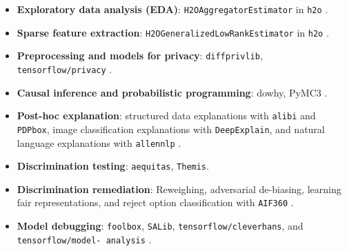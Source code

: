 \documentclass[information,article,accept,moreauthors,pdftex]{Definitions/mdpi}
\begin{document}
\begin{itemize}[leftmargin=*,labelsep=5.8mm]%

\item \textbf{{Exploratory data analysis (EDA)}}: \texttt{H2OAggregatorEstimator} in 
{\texttt{{h2o}}} \cite{wilkinson2018visualizing}.

\item \textbf{Sparse feature extraction}: \texttt{H2OGeneralizedLowRankEstimator} in 
{\texttt{{h2o}}} \cite{udell2016generalized}.

\item \textbf{Preprocessing and models for privacy}: 
{\texttt{diffprivlib}}, 
{\texttt{{tensorflow/privacy}}} \cite{diffprivlib,ji2014differential,pate,abadi2016deep}.

\item \textbf{Causal inference and probabilistic programming}: 
{{dowhy}}, 
{PyMC3} \cite{book_of_why}.

\item \textbf{Post-hoc explanation}: structured data explanations with 
{\texttt{{alibi}}} and 
{\texttt{{PDPbox}}}, image classification explanations with 
{\texttt{{DeepExplain}}}, and natural language explanations with 
{\texttt{{allennlp}}} \cite{wachter2017counterfactual,grad_attr,wallace2019allennlp}. 

\item \textbf{Discrimination testing}: 
{\texttt{aequitas}}, 
{\texttt{Themis}}.

\item \textbf{Discrimination remediation}: Reweighing, adversarial de-biasing, learning fair representations, and reject option classification with 
{\texttt{{AIF}360}} \cite{kamiran2012data,zhang2018mitigating,lfr,kamiran2012decision}.

\item \textbf{Model debugging}: 
{\texttt{{foolbox}}}, 
{\texttt{{SALib}}}, 
{\texttt{{tensorflow/cleverhans}}}, and 
{\texttt{{tensorflow/model- analysis}}} \cite{rauber2017foolbox,papernot2018cleverhans,modeltracker,papernot2018marauder}.


\end{itemize}
\end{document}

